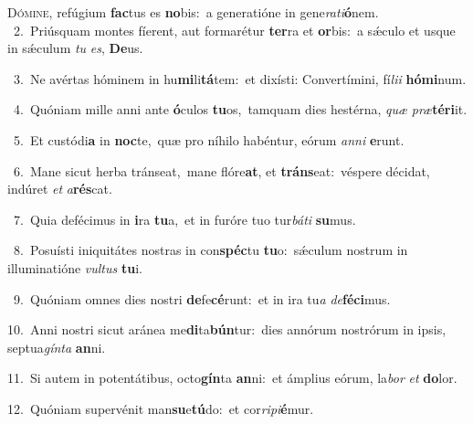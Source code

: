 \lettrine{\initial\textcolor{\initialcolor}{D}}{ómine,} refúgium \textbf{fac}\-tus es \textbf{no}\-bis:~\star a generatióne in gene\-\textit{ra}\-\textit{ti}\textbf{ó}nem.\\
{\numbfont\textcolor{\numbcolor}{~2.}}~Priúsquam montes fíerent, aut formarétur \textbf{ter}\-ra et \textbf{or}\-bis:~\star a sǽculo et usque in sǽculum \textit{tu} \textit{es}\-, \textbf{De}\-us.\par
{\numbfont\textcolor{\numbcolor}{~3.}}~Ne avértas hóminem in hu\-\textbf{mi}\-li\-\textbf{tá}\-tem:~\star et dixísti: Convertímini, fí\-\textit{li}\-\textit{i} \textbf{hó}\-\textbf{mi}num.\par
{\numbfont\textcolor{\numbcolor}{~4.}}~Quóniam mille anni ante \textbf{ó}\-culos \textbf{tu}\-os,~\star tamquam dies hestérna, \textit{quæ} \textit{præ}\-\textbf{tér}\textbf{i}it.\par
{\numbfont\textcolor{\numbcolor}{~5.}}~Et custódi\textbf{a} in \textbf{noc}\-te,~\star quæ pro níhilo habéntur, eórum \textit{an}\-\textit{ni} \textbf{e}\-runt.\par
{\numbfont\textcolor{\numbcolor}{~6.}}~Mane sicut herba tránseat,~\dagger mane flóre\-\textbf{at}\-, et \textbf{tráns}\-eat:~\star véspere décidat, indúret \textit{et} \textit{a}\-\textbf{rés}cat.\par
{\numbfont\textcolor{\numbcolor}{~7.}}~Quia defécimus in \textbf{i}\-ra \textbf{tu}\-a,~\star et in furóre tuo tur\-\textit{bá}\-\textit{ti} \textbf{su}\-mus.\par
{\numbfont\textcolor{\numbcolor}{~8.}}~Posuísti iniquitátes nostras in con\-\textbf{spéc}\-tu \textbf{tu}\-o:~\star sǽculum nostrum in illuminatióne \textit{vul}\-\textit{tus} \textbf{tu}\-i.\par
{\numbfont\textcolor{\numbcolor}{~9.}}~Quóniam omnes dies nostri \textbf{de}\-fe\-\textbf{cé}\-runt:~\star et in ira tu\textit{a} \textit{de}\-\textbf{fé}\textbf{ci}mus.\par
{\numbfont\textcolor{\numbcolor}{10.}}~Anni nostri sicut aránea me\-\textbf{di}\-ta\-\textbf{bún}\-tur:~\star dies annórum nostrórum in ipsis, septua\-\textit{gín}\-\textit{ta} \textbf{an}\-ni.\par
{\numbfont\textcolor{\numbcolor}{11.}}~Si autem in potentátibus, octo\-\textbf{gín}\-ta \textbf{an}\-ni:~\star et ámplius eórum, la\textit{bor} \textit{et} \textbf{do}\-lor.\par
{\numbfont\textcolor{\numbcolor}{12.}}~Quóniam supervénit man\-\textbf{su}\-e\-\textbf{tú}\-do:~\star et cor\-\textit{ri}\-\textit{pi}\textbf{é}mur.\par
